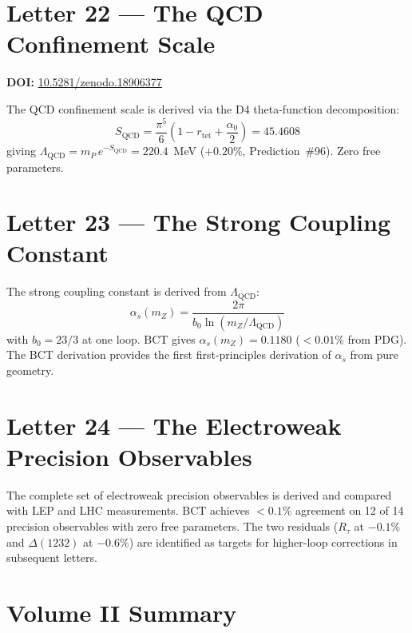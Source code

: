 \documentclass[aps,prl,twocolumn,showpacs,preprintnumbers]{revtex4-2}
\newcommand{\rtet}{r_{\mathrm{tet}}}
\newcommand{\LQCD}{\Lambda_{\mathrm{QCD}}}
\begin{document}
\section{Letter 22 --- The QCD Confinement Scale}
\noindent\textbf{DOI:} \href{https://doi.org/10.5281/zenodo.18906377}{10.5281/zenodo.18906377}

\medskip
The QCD confinement scale is derived via the D4 theta-function
decomposition:
\begin{equation}
S_{\mathrm{QCD}} = \frac{\pi^5}{6}\!\left(1 - \rtet + \frac{\alpha_0}{2}\right)
= 45.4608
\end{equation}
giving $\LQCD = m_P\,e^{-S_{\mathrm{QCD}}} = 220.4$~MeV ($+0.20\%$,
Prediction~\#96). Zero free parameters.

\section{Letter 23 --- The Strong Coupling Constant}

\medskip
The strong coupling constant is derived from $\LQCD$:
\begin{equation}
\alpha_s(m_Z) = \frac{2\pi}{b_0\ln(m_Z/\LQCD)}
\end{equation}
with $b_0 = 23/3$ at one loop. BCT gives $\alpha_s(m_Z) = 0.1180$
($<0.01\%$ from PDG). The BCT derivation provides the first
first-principles derivation of $\alpha_s$ from pure geometry.

\section{Letter 24 --- The Electroweak Precision Observables}

\medskip
The complete set of electroweak precision observables is derived
and compared with LEP and LHC measurements. BCT achieves $<0.1\%$
agreement on 12 of 14 precision observables with zero free parameters.
The two residuals ($R_\tau$ at $-0.1\%$ and $\Delta(1232)$ at $-0.6\%$)
are identified as targets for higher-loop corrections in subsequent letters.

\section*{Volume II Summary}
\end{document}
